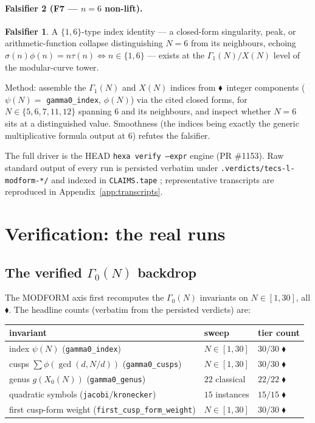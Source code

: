 \documentclass[11pt,a4paper]{article}
\newcommand{\tierF}{\textcolor{blue!60!black}{$\blacklozenge$}}   %
\newcommand{\sig}{\sigma}
\newcommand{\Gz}{\Gamma_0}
\newcommand{\Go}{\Gamma_1}
\theoremstyle{definition}
\newtheorem{falsifier}{Falsifier}
\begin{document}
\paragraph{Falsifier 2 (F7 --- $n=6$ non-lift).}
\begin{falsifier}\label{fals:2}
A $\{1,6\}$-type index identity --- a closed-form singularity, peak, or
arithmetic-function collapse distinguishing $N=6$ from its neighbours, echoing
$\sig(n)\phi(n)=n\tau(n)\iff n\in\{1,6\}$ --- exists at the $\Go(N)/X(N)$ level of
the modular-curve tower.
\end{falsifier}
\noindent
Method: assemble the $\Go(N)$ and $X(N)$ indices from \tierF\ integer components
($\psi(N)=$ \texttt{gamma0\_index}, $\phi(N)$) via the cited closed forms, for
$N\in\{5,6,7,11,12\}$ spanning $6$ and its neighbours, and inspect whether $N=6$
sits at a distinguished value. Smoothness (the indices being exactly the generic
multiplicative formula output at $6$) refutes the falsifier.

The full driver is the HEAD \texttt{hexa verify --expr} engine (PR \#1153). Raw
standard output of every run is persisted verbatim under
\texttt{.verdicts/tecs-l-modform-*/} and indexed in \texttt{CLAIMS.tape}
\citep{tecs-l-claims}; representative transcripts are reproduced in
Appendix~\ref{app:transcripts}.

\section{Verification: the real runs}
\label{sec:verification}

\subsection{The verified $\Gz(N)$ backdrop}
\label{sec:backdrop}

The MODFORM axis first recomputes the $\Gz(N)$ invariants on $N\in[1,30]$, all
\tierF. The headline counts (verbatim from the persisted verdicts) are:

\begin{center}
\begin{tabular}{lll}
\toprule
invariant & sweep & tier count \\
\midrule
index $\psi(N)$ (\texttt{gamma0\_index})        & $N\in[1,30]$ & $30/30$ \tierF \\
cusps $\sum\phi(\gcd(d,N/d))$ (\texttt{gamma0\_cusps}) & $N\in[1,30]$ & $30/30$ \tierF \\
genus $g(X_0(N))$ (\texttt{gamma0\_genus})       & $22$ classical & $22/22$ \tierF \\
quadratic symbols (\texttt{jacobi}/\texttt{kronecker}) & $15$ instances & $15/15$ \tierF \\
first cusp-form weight (\texttt{first\_cusp\_form\_weight}) & $N\in[1,30]$ & $30/30$ \tierF \\
\bottomrule
\end{tabular}
\end{center}
\end{document}
